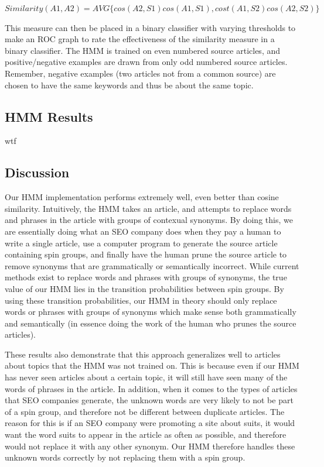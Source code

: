\documentclass[11pt,letterpaper,oneside, titlepage]{scrartcl}
\begin{document}
$Similarity(A1, A2) = AVG\{ cos(A2, S1)cos(A1, S1) , cost(A1, S2)cos(A2, S2) \}$

This measure can then be placed in a binary classifier with varying thresholds to make an ROC graph to rate the effectiveness of the similarity measure in a binary classifier. The HMM is trained on even numbered source articles, and positive/negative examples are drawn from only odd numbered source articles. Remember, negative examples (two articles not from a common source) are chosen to have the same keywords and thus be about the same topic.

\subsection{HMM Results}

wtf


\subsection{Discussion}

Our HMM implementation performs extremely well, even better than cosine similarity. Intuitively, the HMM takes an article, and attempts to replace words and phrases in the article with groups of contexual synonyms. By doing this, we are essentially doing what an SEO company does when they pay a human to write a single article, use a computer program to generate the source article containing spin groups, and finally have the human prune the source article to remove synonyms that are grammatically or semantically incorrect. While current methods exist to replace words and phrases with groups of synonyms, the true value of our HMM lies in the transition probabilities between spin groups. By using these transition probabilities, our HMM in theory should only replace words or phrases with groups of synonyms which make sense both grammatically and semantically (in essence doing the work of the human who prunes the source articles). 

These results also demonstrate that this approach generalizes well to articles about topics that the HMM was not trained on. This is because even if our HMM has never seen articles about a certain topic, it will still have seen many of the words of phrases in the article. In addition, when it comes to the types of articles that SEO companies generate, the unknown words are very likely to not be part of a spin group, and therefore not be different between duplicate articles. The reason for this is if an SEO company were promoting a site about suits, it would want the word suits to appear in the article as often as possible, and therefore would not replace it with any other synonym. Our HMM therefore handles these unknown words correctly by not replacing them with a spin group. 
\end{document}
